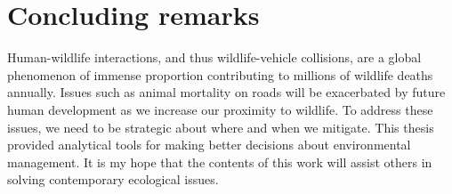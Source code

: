 \section{Concluding remarks}

Human-wildlife interactions, and thus wildlife-vehicle collisions, are a global phenomenon of immense proportion contributing to millions of wildlife deaths annually. Issues such as animal mortality on roads will be exacerbated by future human development as we increase our proximity to wildlife. To address these issues, we need to be strategic about where and when we mitigate. This thesis provided analytical tools for making better decisions about environmental management. It is my hope that the contents of this work will assist others in solving contemporary ecological issues.